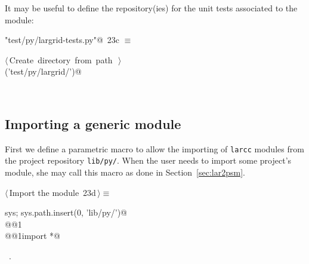 \documentclass[11pt,oneside]{article}	%
\begin{document}
It may be useful to define the repository(ies) for the unit tests associated to the module:
\begin{flushleft} \small
\begin{minipage}{\linewidth} \label{scrap41}
\protect{}\verb@"test/py/largrid-tests.py"@\nobreak\ {\footnotesize 23c }$\equiv$
\vspace{-1ex}
\begin{list}{}{} \item
\mbox{}\verb@@\hbox{$\langle\,$Create directory from path\nobreak\ {\footnotesize {}}$\,\rangle$}\verb@@\\
\mbox{}\verb@createDir('test/py/largrid/')@\\
\mbox{}\verb@@{\NWsep}
\end{list}
\vspace{-2ex}
\end{minipage}\\[4ex]
\end{flushleft}

\subsection{Importing a generic module}
First we define a parametric macro to allow the importing of \texttt{larcc} modules from the project repository \texttt{lib/py/}. When the user needs to import some project's module, she may call this macro as done in Section~\ref{sec:lar2psm}.
\begin{flushleft} \small
\begin{minipage}{\linewidth} \label{scrap42}
\protect{}$\langle\,$Import the module\nobreak\ {\footnotesize 23d}$\,\rangle\equiv$
\vspace{-1ex}
\begin{list}{}{} \item
\mbox{}\verb@import sys; sys.path.insert(0, 'lib/py/')@\\
\mbox{}\verb@import @@1\verb@@\\
\mbox{}\verb@from @@1\verb@ import *@\\
\mbox{}\verb@@{\NWsep}
\end{list}
\vspace{-1ex}
\footnotesize\addtolength{\baselineskip}{-1ex}
\begin{list}{}{\setlength{\itemsep}{-\parsep}\setlength{\itemindent}{-\leftmargin}}
\item \NWtxtMacroRefIn\ .
\end{list}
\end{minipage}\\[4ex]
\end{flushleft}
\end{document}

